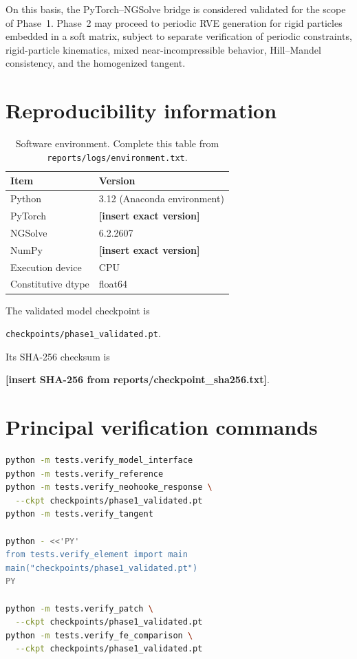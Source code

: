 \documentclass[11pt,a4paper]{article}
\newcommand{\placeholder}[1]{\textcolor{red!70!black}{\textbf{[#1]}}}
\begin{document}
On this basis, the PyTorch--NGSolve bridge is considered validated for the
scope of Phase~1. Phase~2 may proceed to periodic RVE generation for rigid
particles embedded in a soft matrix, subject to separate verification of
periodic constraints, rigid-particle kinematics, mixed near-incompressible
behavior, Hill--Mandel consistency, and the homogenized tangent.

\appendix

\section{Reproducibility information}

\begin{table}[H]
  \centering
  \caption{Software environment. Complete this table from
  \texttt{reports/logs/environment.txt}.}
  \begin{tabular}{ll}
    \toprule
    Item & Version\\
    \midrule
    Python & 3.12 (Anaconda environment)\\
    PyTorch & \placeholder{insert exact version}\\
    NGSolve & 6.2.2607\\
    NumPy & \placeholder{insert exact version}\\
    Execution device & CPU\\
    Constitutive dtype & float64\\
    \bottomrule
  \end{tabular}
\end{table}

The validated model checkpoint is
\begin{center}
  \texttt{checkpoints/phase1\_validated.pt}.
\end{center}
Its SHA-256 checksum is
\begin{center}
  \placeholder{insert SHA-256 from reports/checkpoint\_sha256.txt}.
\end{center}

\section{Principal verification commands}

\begin{lstlisting}[language=bash]
python -m tests.verify_model_interface
python -m tests.verify_reference
python -m tests.verify_neohooke_response \
  --ckpt checkpoints/phase1_validated.pt
python -m tests.verify_tangent

python - <<'PY'
from tests.verify_element import main
main("checkpoints/phase1_validated.pt")
PY

python -m tests.verify_patch \
  --ckpt checkpoints/phase1_validated.pt
python -m tests.verify_fe_comparison \
  --ckpt checkpoints/phase1_validated.pt
\end{lstlisting}
\end{document}
